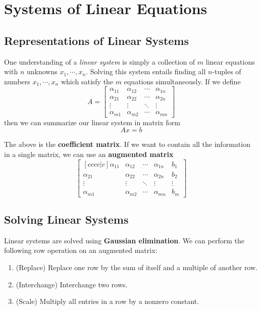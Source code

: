 \chapter{Systems of Linear Equations}

\section{Representations of Linear Systems}
One understanding of a \textit{linear system} is simply a collection of $m$ linear equations with $n$ unknowns $x_{1}, \cdots, x_{n}$. Solving this system entails finding all $n$-tuples of numbers $x_{1}, \cdots, x_{n}$ which satisfy the $m$ equations simultaneously. If we define 
$$A = \begin{bmatrix}
\alpha_{11} & \alpha_{12} & \cdots & \alpha_{1n} \\
\alpha_{21} & \alpha_{22} & \cdots & \alpha_{2n} \\
\vdots & \vdots & \ddots & \vdots \\
\alpha_{m1} & \alpha_{m2} & \cdots & \alpha_{mn}
\end{bmatrix}$$
then we can summarize our linear system in matrix form
$$Ax = b$$

The above is the \textbf{coefficient matrix}. If we want to contain all the information in a single matrix, we can use an \textbf{augmented matrix}
$$\begin{bmatrix}[cccc|c]
\alpha_{11} & \alpha_{12} & \cdots & \alpha_{1n} & b_{1}\\
\alpha_{21} & \alpha_{22} & \cdots & \alpha_{2n} & b_{2}\\
\vdots & \vdots & \ddots & \vdots & \vdots\\
\alpha_{m1} & \alpha_{m2} & \cdots & \alpha_{mn} & b_{m}
\end{bmatrix}$$

\section{Solving Linear Systems}
Linear systems are solved using \textbf{Gaussian elimination}. We can perform the following row operation on an augmented matrix:
\begin{enumerate}
	\item (Replace) Replace one row by the sum of itself and a multiple of another row. 
	\item (Interchange) Interchange two rows. 
	\item (Scale) Multiply all entries in a row by a nonzero constant. 
\end{enumerate}

